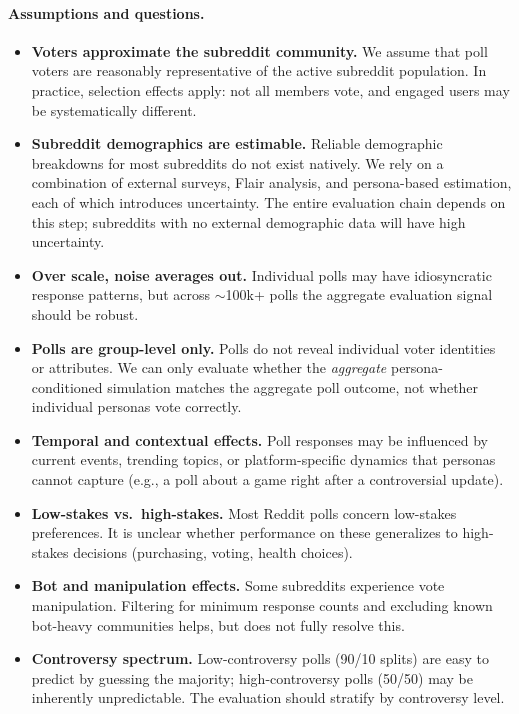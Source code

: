 \paragraph{Assumptions and questions.}
\begin{itemize}
    \item \textbf{Voters approximate the subreddit community.} We assume that poll voters are reasonably representative of the active subreddit population. In practice, selection effects apply: not all members vote, and engaged users may be systematically different.
    \item \textbf{Subreddit demographics are estimable.} Reliable demographic breakdowns for most subreddits do not exist natively. We rely on a combination of external surveys, Flair analysis, and persona-based estimation, each of which introduces uncertainty. The entire evaluation chain depends on this step; subreddits with no external demographic data will have high uncertainty.
    \item \textbf{Over scale, noise averages out.} Individual polls may have idiosyncratic response patterns, but across ${\sim}$100k+ polls the aggregate evaluation signal should be robust.
    \item \textbf{Polls are group-level only.} Polls do not reveal individual voter identities or attributes. We can only evaluate whether the \emph{aggregate} persona-conditioned simulation matches the aggregate poll outcome, not whether individual personas vote correctly.
    \item \textbf{Temporal and contextual effects.} Poll responses may be influenced by current events, trending topics, or platform-specific dynamics that personas cannot capture (e.g., a poll about a game right after a controversial update).
    \item \textbf{Low-stakes vs.\ high-stakes.} Most Reddit polls concern low-stakes preferences. It is unclear whether performance on these generalizes to high-stakes decisions (purchasing, voting, health choices).
    \item \textbf{Bot and manipulation effects.} Some subreddits experience vote manipulation. Filtering for minimum response counts and excluding known bot-heavy communities helps, but does not fully resolve this.
    \item \textbf{Controversy spectrum.} Low-controversy polls (90/10 splits) are easy to predict by guessing the majority; high-controversy polls (50/50) may be inherently unpredictable. The evaluation should stratify by controversy level.

\end{itemize}
